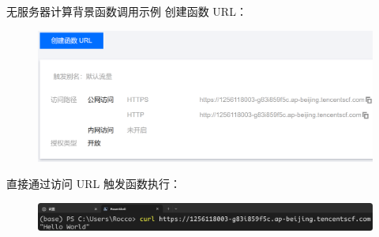 \documentclass[aspectratio=169]{beamer}
\begin{document}
\begin{frame}{无服务器计算背景}{函数调用示例}
  创建函数 URL：
  \begin{figure}
    \centering
    \includegraphics[height=0.45\textheight]{img/serverless-background/scf-invoke-1.png}
  \end{figure}
  直接通过访问 URL 触发函数执行：
  \begin{figure}
    \centering
    \includegraphics[height=0.15\textheight]{img/serverless-background/scf-invoke-2.png}
  \end{figure}
\end{frame}
\end{document}
